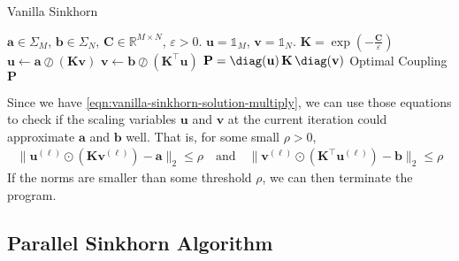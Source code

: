 \begin{algorithm}[H]
  \caption{Vanilla Sinkhorn}
  \begin{algorithmic}[1]\label{algo:vanilla-sinkhorn}
    \Require $\mathbf{a} \in \Sigma_M$, $\mathbf{b} \in \Sigma_N$, $\mathbf{C} \in \mathbb{R}^{M\times N}$, $\varepsilon > 0$.
    \Initialize $\mathbf{u} = \mathbb{1}_M$, $\mathbf{v} = \mathbb{1}_N$.
    \State $\mathbf{K} = \exp(-\frac{\mathbf{C}}{\varepsilon})$
    \State $\mathbf{u} \leftarrow \mathbf{a} \oslash (\mathbf{K} \mathbf{v})$
    \State $\mathbf{v} \leftarrow \mathbf{b} \oslash (\mathbf{K}^\top \mathbf{u})$
    \EndWhile
    \State $\mathbf{P} = \diag(\mathbf{u}) \, \mathbf{K} \, \diag(\mathbf{v})$
    \Ensure Optimal Coupling $\mathbf{P}$
  \end{algorithmic}
\end{algorithm}

\begin{remark}
  Since we have \cref{eqn:vanilla-sinkhorn-solution-multiply}, we can use those equations to check if the scaling variables
  $\mathbf{u}$ and $\mathbf{v}$ at the current iteration could approximate $\mathbf{a}$ and $\mathbf{b}$ well.
  That is, for some small $\rho > 0$,
  \begin{equation*}
    \begin{aligned}
      \lVert \mathbf{u}^{(\ell)} \odot \left(\mathbf{K} \mathbf{v}^{(\ell)}\right) - \mathbf{a}\rVert_2 \le \rho
      \quad\text{and}\quad
      \lVert \mathbf{v}^{(\ell)} \odot \left(\mathbf{K}^\top \mathbf{u}^{(\ell)}\right) - \mathbf{b}\rVert_2 \le \rho
    \end{aligned}
  \end{equation*}
  If the norms are smaller than some threshold $\rho$, we can then terminate the program.
\end{remark}



























\subsection{Parallel Sinkhorn Algorithm}\label{subsec:parallel-sinkhorn}

